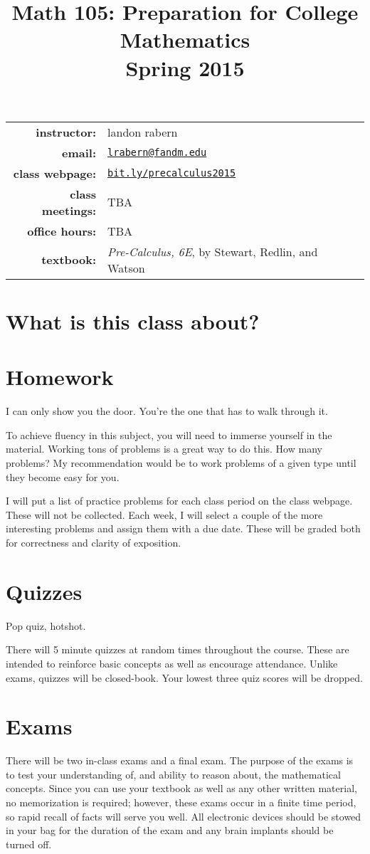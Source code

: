 \documentclass[12pt]{article}
\title{Math 105: Preparation for College Mathematics\\ \bigskip\small{Spring 2015}}
\date{}
\begin{document}
\maketitle

\begin{tabular}{r l}
\textbf{instructor:}& landon rabern\\
\textbf{email:}& \href{mailto:lrabern@fandm.edu}{\nolinkurl{lrabern@fandm.edu}}\\
\textbf{class webpage:}& \href{http://bit.ly/calculus2015}{\nolinkurl{bit.ly/precalculus2015}}\\
\textbf{class meetings:}& TBA\\
\textbf{office hours:}& TBA\\
\textbf{textbook:}& \textit{Pre-Calculus, 6E}, by Stewart, Redlin, and Watson\\
\end{tabular}

\section*{What is this class about?}

\section*{Homework}
\epigraph{I can only show you the door. You're the one that has to walk through it.}{}
To achieve fluency in this subject, you will need to immerse yourself in the material.  
Working tons of problems is a great way to do this.  How many problems?  
My recommendation would be to work problems of a given type until they become easy for you.

I will put a list of practice problems for each class period on the class webpage.  These will not be collected.  
Each week, I will select a couple of the more interesting problems and assign them with a due date.  
These will be graded both for correctness and clarity of exposition.

\section*{Quizzes}
\epigraph{Pop quiz, hotshot.}{}
There will 5 minute quizzes at random times throughout the course.  
These are intended to reinforce basic concepts as well as encourage attendance.
Unlike exams, quizzes will be closed-book.  Your lowest three quiz scores will be dropped.

\section*{Exams}
There will be two in-class exams and a final exam. 
The purpose of the exams is to test your understanding of, and ability to reason about, the mathematical concepts. Since you can use your textbook as well as any other written material, no memorization is required; however, these exams occur in a finite time period, so rapid recall of facts will serve you well.  All electronic devices should be stowed in your bag for the duration of the exam and any brain implants should be turned off.
\end{document}
